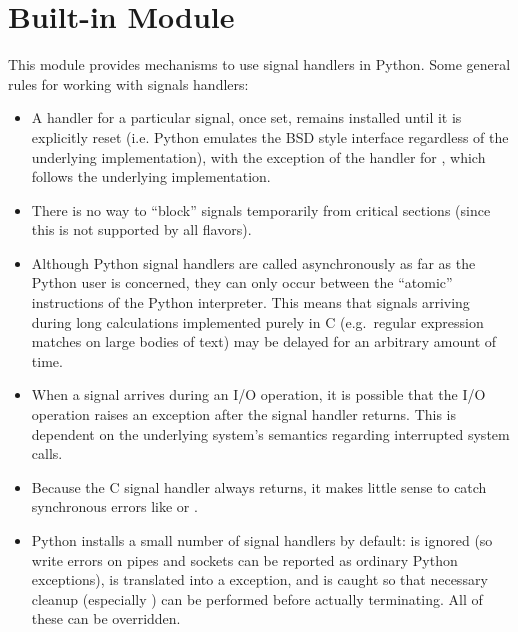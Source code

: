 \section{Built-in Module }
\label{module-signal}

This module provides mechanisms to use signal handlers in Python.
Some general rules for working with signals handlers:

\begin{itemize}

\item
A handler for a particular signal, once set, remains installed until
it is explicitly reset (i.e. Python emulates the BSD style interface
regardless of the underlying implementation), with the exception of
the handler for , which follows the underlying
implementation.

\item
There is no way to ``block'' signals temporarily from critical
sections (since this is not supported by all \UNIX{} flavors).

\item
Although Python signal handlers are called asynchronously as far as
the Python user is concerned, they can only occur between the
``atomic'' instructions of the Python interpreter.  This means that
signals arriving during long calculations implemented purely in C
(e.g.\ regular expression matches on large bodies of text) may be
delayed for an arbitrary amount of time.

\item
When a signal arrives during an I/O operation, it is possible that the
I/O operation raises an exception after the signal handler returns.
This is dependent on the underlying \UNIX{} system's semantics regarding
interrupted system calls.

\item
Because the C signal handler always returns, it makes little sense to
catch synchronous errors like  or .

\item
Python installs a small number of signal handlers by default:
 is ignored (so write errors on pipes and sockets can be
reported as ordinary Python exceptions),  is translated
into a  exception, and  is
caught so that necessary cleanup (especially ) can
be performed before actually terminating.  All of these can be
overridden.


\end{itemize}

